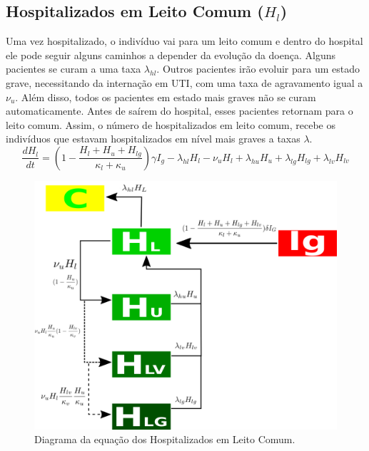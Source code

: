 \documentclass[12pt,a4papper]{article}
\begin{document}
\subsection{Hospitalizados em Leito Comum ($H_l$)}
Uma vez hospitalizado, o indivíduo vai para um leito comum e dentro do hospital ele pode seguir alguns caminhos a depender da evolução da doença. Alguns pacientes se curam a uma taxa $\lambda_{hl}$. Outros pacientes irão evoluir para um estado grave, necessitando da internação em UTI, com uma taxa de agravamento igual a $\nu_u$. Além disso, todos os pacientes em estado mais graves não se curam automaticamente. Antes de saírem do hospital, esses pacientes retornam para o leito comum. Assim, o número de hospitalizados em leito comum, recebe os indivíduos que estavam hospitalizados em nível mais graves a taxas $\lambda$.
\begin{equation}
	\frac{dH_l}{dt}=(1-\frac{H_l+H_u+H_{lg}}{\kappa_l+\kappa_u})\gamma I_g - \lambda_{hl} H_l - \nu_uH_l + \lambda_{hu}H_u +\lambda_{lg}H_{lg} +\lambda_{lv}H_{lv}
\end{equation}
\begin{figure}[!h]
	\centering
	\includegraphics[scale=0.3]{covidHl}
	\caption{Diagrama da equação dos Hospitalizados em Leito Comum.}
	\label{fig:universe}
\end{figure}
\end{document}
